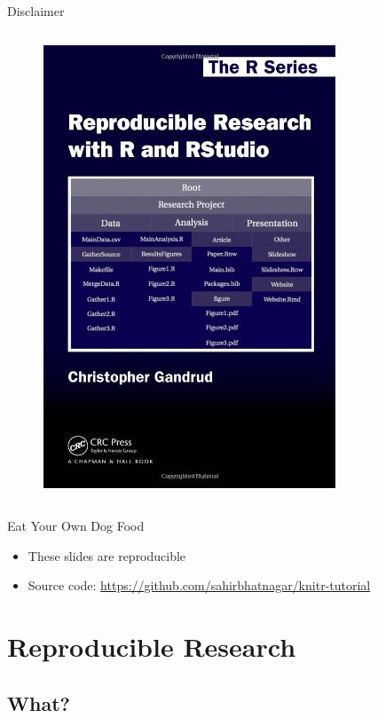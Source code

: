 \documentclass[10pt]{beamer}\usepackage[]{graphicx}\usepackage[]{color}
\begin{document}
\begin{frame}{Disclaimer}
\begin{columns}[c]
\begin{figure}
\includegraphics[width=0.6\columnwidth]{chris.png}
\end{figure}
\end{columns}

\end{frame}


\begin{frame}{Eat Your Own Dog Food}

\begin{itemize}
\item These slides are reproducible
\item Source code: \href{https://github.com/sahirbhatnagar/knitr-tutorial}{https://github.com/sahirbhatnagar/knitr-tutorial}
\end{itemize}

\end{frame}


\section{Reproducible Research}

\subsection{What?}
\end{document}

